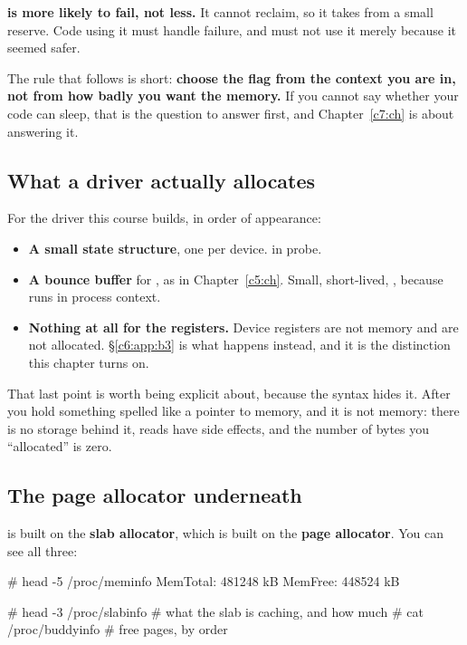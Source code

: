 \textbf{ is more likely to fail, not less.} It cannot reclaim, so it takes from a
small reserve. Code using it must handle failure, and must not use it merely because it seemed
safer.

The rule that follows is short: \textbf{choose the flag from the context you are in, not from how
badly you want the memory.} If you cannot say whether your code can sleep, that is the question to
answer first, and Chapter~\ref{c7:ch} is about answering it.

\subsection{What a driver actually allocates}
\label{c6:app:a4}

For the driver this course builds, in order of appearance:
\begin{itemize}
  \item \textbf{A small state structure}, one per device. 
    in probe.
  \item \textbf{A bounce buffer} for , as in Chapter~\ref{c5:ch}. Small,
    short-lived, , because  runs in process context.
  \item \textbf{Nothing at all for the registers.} Device registers are not memory and are not
    allocated. \S\ref{c6:app:b3} is what happens instead, and it is the distinction this chapter
    turns on.
\end{itemize}
That last point is worth being explicit about, because the syntax hides it. After  you
hold something spelled like a pointer to memory, and it is not memory: there is no storage behind
it, reads have side effects, and the number of bytes you ``allocated'' is zero.

\subsection{The page allocator underneath}
\label{c6:app:a5}

 is built on the \textbf{slab allocator}, which is built on the \textbf{page
allocator}. You can see all three:

\begin{console}
# head -5 /proc/meminfo
MemTotal:         481248 kB
MemFree:          448524 kB

# head -3 /proc/slabinfo        # what the slab is caching, and how much
# cat /proc/buddyinfo           # free pages, by order
\end{console}

